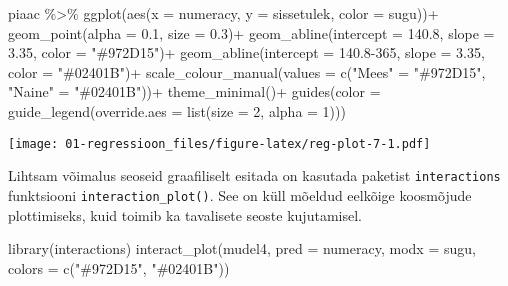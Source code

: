 \documentclass[
]{book}
\newenvironment{Shaded}{\begin{snugshade}}{\end{snugshade}}
\newcommand{\AttributeTok}[1]{\textcolor[rgb]{0.77,0.63,0.00}{#1}}
\newcommand{\DecValTok}[1]{\textcolor[rgb]{0.00,0.00,0.81}{#1}}
\newcommand{\FloatTok}[1]{\textcolor[rgb]{0.00,0.00,0.81}{#1}}
\newcommand{\FunctionTok}[1]{\textcolor[rgb]{0.00,0.00,0.00}{#1}}
\newcommand{\NormalTok}[1]{#1}
\newcommand{\OtherTok}[1]{\textcolor[rgb]{0.56,0.35,0.01}{#1}}
\newcommand{\SpecialCharTok}[1]{\textcolor[rgb]{0.00,0.00,0.00}{#1}}
\newcommand{\StringTok}[1]{\textcolor[rgb]{0.31,0.60,0.02}{#1}}
\begin{document}
\begin{Shaded}
\begin{Highlighting}[]
\NormalTok{piaac }\SpecialCharTok{\%\textgreater{}\%} 
  \FunctionTok{ggplot}\NormalTok{(}\FunctionTok{aes}\NormalTok{(}\AttributeTok{x =}\NormalTok{ numeracy, }\AttributeTok{y =}\NormalTok{ sissetulek, }\AttributeTok{color =}\NormalTok{ sugu))}\SpecialCharTok{+}
  \FunctionTok{geom\_point}\NormalTok{(}\AttributeTok{alpha =} \FloatTok{0.1}\NormalTok{, }\AttributeTok{size =} \FloatTok{0.3}\NormalTok{)}\SpecialCharTok{+}
  \FunctionTok{geom\_abline}\NormalTok{(}\AttributeTok{intercept =} \FloatTok{140.8}\NormalTok{, }\AttributeTok{slope =} \FloatTok{3.35}\NormalTok{, }\AttributeTok{color =} \StringTok{"\#972D15"}\NormalTok{)}\SpecialCharTok{+}
  \FunctionTok{geom\_abline}\NormalTok{(}\AttributeTok{intercept =} \FloatTok{140.8}\DecValTok{{-}365}\NormalTok{, }\AttributeTok{slope =} \FloatTok{3.35}\NormalTok{, }\AttributeTok{color =} \StringTok{"\#02401B"}\NormalTok{)}\SpecialCharTok{+}
  \FunctionTok{scale\_colour\_manual}\NormalTok{(}\AttributeTok{values =} \FunctionTok{c}\NormalTok{(}\StringTok{"Mees"} \OtherTok{=} \StringTok{"\#972D15"}\NormalTok{, }\StringTok{"Naine"} \OtherTok{=} \StringTok{"\#02401B"}\NormalTok{))}\SpecialCharTok{+}
  \FunctionTok{theme\_minimal}\NormalTok{()}\SpecialCharTok{+}
  \FunctionTok{guides}\NormalTok{(}\AttributeTok{color =} \FunctionTok{guide\_legend}\NormalTok{(}\AttributeTok{override.aes =} \FunctionTok{list}\NormalTok{(}\AttributeTok{size =} \DecValTok{2}\NormalTok{, }\AttributeTok{alpha =} \DecValTok{1}\NormalTok{)))}
\end{Highlighting}
\end{Shaded}

\texttt{[image: 01-regressioon\_files/figure-latex/reg-plot-7-1.pdf]}

Lihtsam võimalus seoseid graafiliselt esitada on kasutada paketist \texttt{interactions} funktsiooni \texttt{interaction\_plot()}. See on küll mõeldud eelkõige koosmõjude plottimiseks, kuid toimib ka tavalisete seoste kujutamisel.

\begin{Shaded}
\begin{Highlighting}[]
\FunctionTok{library}\NormalTok{(interactions)}
\FunctionTok{interact\_plot}\NormalTok{(mudel4, }\AttributeTok{pred =}\NormalTok{ numeracy, }\AttributeTok{modx =}\NormalTok{ sugu, }\AttributeTok{colors =} \FunctionTok{c}\NormalTok{(}\StringTok{"\#972D15"}\NormalTok{, }\StringTok{"\#02401B"}\NormalTok{))}
\end{Highlighting}
\end{Shaded}
\end{document}
